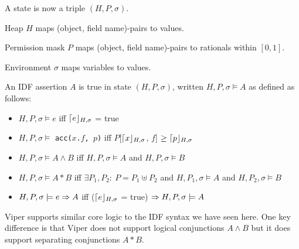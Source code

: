 \begin{mytitle}[State] A state is now a triple $(H, P, \sigma)$.
    \begin{mysubtitle}[Heap] Heap $H$ maps (object, field name)-pairs to values.
    \end{mysubtitle}
    \begin{mysubtitle} Permission mask $P$ maps (object, field name)-pairs to rationals within $[0,1]$.
    \end{mysubtitle}
    \begin{mysubtitle}[Environment] Environment $\sigma$  maps variables to values.
    \end{mysubtitle}
\end{mytitle}
\begin{mytitle} An IDF assertion $A$ is true in state $(H, P, \sigma)$, written $H, P, \sigma \models A$ as defined as follows:
\begin{itemize}
    \item $H, P, \sigma \models e$ iff $\lceil e\rfloor_{H, \sigma}$ = true
    \item $H, P, \sigma \models$ \texttt{acc($x$.$f$, $p$)} iff $P$[$\lceil x\rfloor_{H, \sigma}$, $f$] $\ge \lceil p\rfloor_{H, \sigma}$
    \item $H, P, \sigma \models A\land B$ iff $H, P, \sigma \models A$ and $H, P, \sigma \models B$
    \item $H, P, \sigma \models A*B$ iff $\exists P_1, P_2:\ P = P_1 \uplus P_2$ and $H, P_1, \sigma \models A$ and $H, P_2, \sigma \models B$
    \item $H, P, \sigma \models e\Rightarrow A$ iff ($\lceil e\rfloor_{H, \sigma}$ = true) $\Rightarrow H, P, \sigma \models A$
\end{itemize}
\end{mytitle}
\begin{mytitle}[Viper] Viper supports similar core logic to the IDF syntax we have seen here. One key difference is that Viper does not support logical conjunctions $A\land B$ but it does support separating conjunctions $A * B$. 
\end{mytitle}

